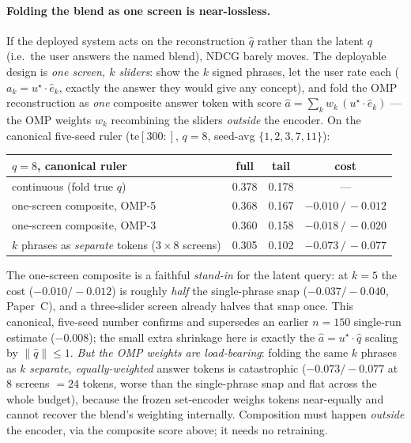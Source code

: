 \documentclass[11pt]{article}
\newcommand{\uk}{u^{\star}}
\newcommand{\qhat}{\hat q}
\begin{document}
\paragraph{Folding the blend as one screen is near-lossless.} If the deployed system acts on the reconstruction $\qhat$
rather than the latent $q$ (i.e.\ the user answers the named blend), NDCG barely moves. The deployable design is
\emph{one screen, $k$ sliders}: show the $k$ signed phrases, let the user rate each ($a_k=\uk\!\cdot\hat e_k$, exactly
the answer they would give any concept), and fold the OMP reconstruction as \emph{one} composite answer token with score
$\hat a=\sum_k w_k\,(\uk\!\cdot\hat e_k)$ --- the OMP weights $w_k$ recombining the sliders \emph{outside} the encoder.
On the canonical five-seed ruler (te$[300{:}]$, $q{=}8$, seed-avg $\{1,2,3,7,11\}$):
\begin{center}\small
\begin{tabular}{lccc}
\toprule
$q{=}8$, canonical ruler & full & tail & cost\\
\midrule
continuous (fold true $q$)               & 0.378 & 0.178 & ---\\
one-screen composite, OMP-5              & 0.368 & 0.167 & $-0.010\,/\,-0.012$\\
one-screen composite, OMP-3              & 0.360 & 0.158 & $-0.018\,/\,-0.020$\\
$k$ phrases as \emph{separate} tokens ($3\times8$ screens) & 0.305 & 0.102 & $-0.073\,/\,-0.077$\\
\bottomrule
\end{tabular}
\end{center}
The one-screen composite is a faithful \emph{stand-in} for the latent query: at $k{=}5$ the cost ($-0.010/-0.012$) is
roughly \emph{half} the single-phrase snap ($-0.037/-0.040$, Paper~C), and a three-slider screen already halves that
snap once. This canonical, five-seed number confirms and supersedes an earlier $n{=}150$ single-run estimate
($-0.008$); the small extra shrinkage here is exactly the $\hat a=\uk\!\cdot\qhat$ scaling by $\lVert\qhat\rVert\le 1$.
\emph{But the OMP weights are load-bearing}: folding the same $k$ phrases as $k$ \emph{separate, equally-weighted}
answer tokens is catastrophic ($-0.073/-0.077$ at $8$ screens $=24$ tokens, worse than the single-phrase snap and flat
across the whole budget), because the frozen set-encoder weighs tokens near-equally and cannot recover the blend's
weighting internally. Composition must happen \emph{outside} the encoder, via the composite score above; it needs no
retraining.
\end{document}
